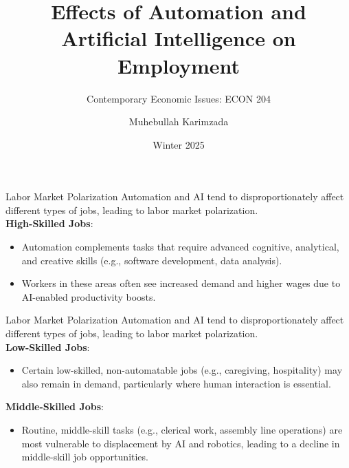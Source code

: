 \documentclass{beamer}
\title{Effects of Automation and Artificial Intelligence on Employment}
\subtitle{Contemporary Economic Issues: ECON 204}
\author{Muhebullah Karimzada}
\date{Winter 2025}
\begin{document}
\frame{\titlepage}

\begin{frame}{Labor Market Polarization}
Automation and AI tend to disproportionately affect different types of jobs, leading to labor market polarization.
\vspace{0.5cm}\\
\textbf{High-Skilled Jobs}:
\begin{itemize}
    \item  Automation complements tasks that require advanced cognitive, analytical, and creative skills (e.g., software development, data analysis). 
    \item Workers in these areas often see increased demand and higher wages due to AI-enabled productivity boosts.
\end{itemize}
\end{frame}

\begin{frame}{Labor Market Polarization}
Automation and AI tend to disproportionately affect different types of jobs, leading to labor market polarization.
\vspace{0.5cm}\\
 \textbf{Low-Skilled Jobs}: 
 \begin{itemize}
    \item Certain low-skilled, non-automatable jobs (e.g., caregiving, hospitality) may also remain in demand, particularly where human interaction is essential.

\end{itemize}

   \textbf{Middle-Skilled Jobs}: 
    \begin{itemize}
  \item Routine, middle-skill tasks (e.g., clerical work, assembly line operations) are most vulnerable to displacement by AI and robotics, leading to a decline in middle-skill job opportunities.
\end{itemize}

\end{frame}
\end{document}
